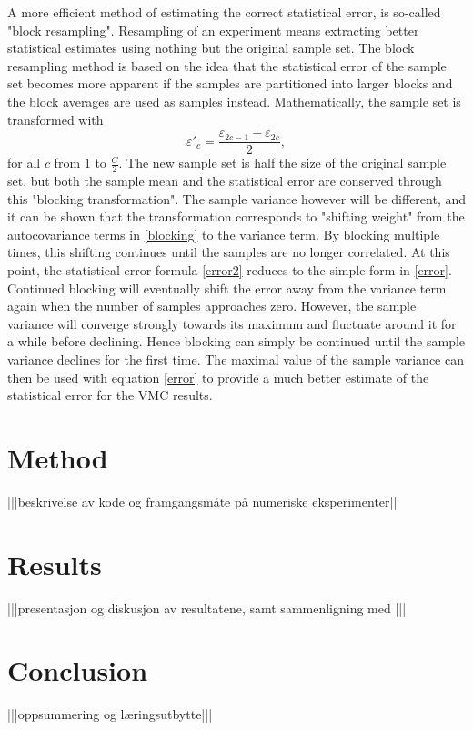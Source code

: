 \documentclass[a4paper,8pt]{article}
\begin{document}
\begin{multicols}{2}
A more efficient method of estimating the correct statistical error, is so-called "block resampling". Resampling of an experiment means extracting better statistical estimates using nothing but the original sample set. The block resampling method is based on the idea that the statistical error of the sample set becomes more apparent if the samples are partitioned into larger blocks and the block averages are used as samples instead. Mathematically, the sample set is transformed with
\begin{equation}
\varepsilon'_c = \frac{\varepsilon_{2c-1}+\varepsilon_{2c}}{2}, \label{blocking}
\end{equation}
for all $c$ from $1$ to $\frac{C}{2}$. The new sample set is half the size of the original sample set, but both the sample mean and the statistical error are conserved through this "blocking transformation". The sample variance however will be different, and it can be shown that the transformation corresponds to "shifting weight" from the autocovariance terms in \eqref{blocking} to the variance term. By blocking multiple times, this shifting continues until the samples are no longer correlated. At this point, the statistical error formula \eqref{error2} reduces to the simple form in \eqref{error}. Continued blocking will eventually shift the error away from the variance term again when the number of samples approaches zero. However, the sample variance will converge strongly towards its maximum and fluctuate around it for a while before declining. Hence blocking can simply be continued until the sample variance declines for the first time. The maximal value of the sample variance can then be used with equation \eqref{error} to provide a much better estimate of the statistical error for the VMC results.


\section{Method} \label{method}

|||beskrivelse av kode og framgangsmåte på numeriske eksperimenter||


\section{Results} \label{results}

|||presentasjon og diskusjon av resultatene, samt sammenligning med \cite{SWL}|||


\section{Conclusion}

|||oppsummering og læringsutbytte|||


\end{multicols}


\end{document}
